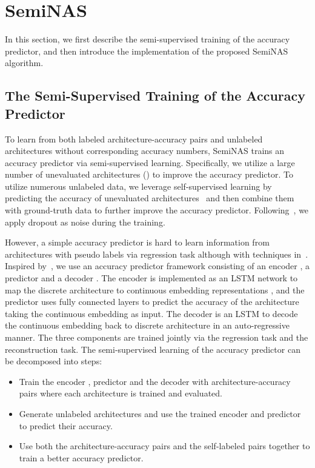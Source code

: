 \documentclass{article}
\begin{document}
\section{SemiNAS}
In this section, we first describe the semi-supervised training of the accuracy predictor, and then introduce the implementation of the proposed SemiNAS algorithm.

\subsection{The Semi-Supervised Training of the Accuracy Predictor}
\label{sec:semitrain}
To learn from both labeled architecture-accuracy pairs and unlabeled architectures without corresponding accuracy numbers, SemiNAS trains an accuracy predictor via semi-supervised learning. Specifically, we utilize a large number of unevaluated architectures () to improve the accuracy predictor. To utilize numerous unlabeled data, we leverage self-supervised learning by predicting the accuracy of unevaluated architectures~\cite{pseudolabel} and then combine them with ground-truth data to further improve the accuracy predictor. Following~\cite{noisystudent}, we apply dropout as noise during the training.

However, a simple accuracy predictor is hard to learn information from architectures with pseudo labels via regression task although with techniques in~\cite{noisystudent}. Inspired by~\cite{nao}, we use an accuracy predictor framework consisting of an encoder , a predictor  and a decoder . The encoder is implemented as an LSTM network to map the discrete architecture  to continuous embedding representations , and the predictor uses fully connected layers to predict the accuracy of the architecture taking the continuous embedding  as input. The decoder is an LSTM to decode the continuous embedding back to discrete architecture in an auto-regressive manner. The three components are trained jointly via the regression task and the reconstruction task. The semi-supervised learning of the accuracy predictor can be decomposed into  steps:
\begin{itemize}
    \item Train the encoder , predictor  and the decoder  with  architecture-accuracy pairs where each architecture is trained and evaluated.
    \item Generate  unlabeled architectures and use the trained encoder  and predictor  to predict their accuracy.
    \item Use both the  architecture-accuracy pairs and the  self-labeled pairs together to train a better accuracy predictor.  
\end{itemize}
\end{document}
